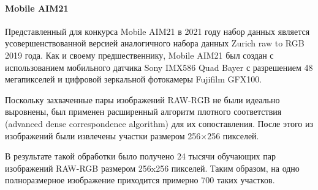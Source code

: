 \paragraph{Mobile AIM21}

Представленный для конкурса Mobile AIM21 в 2021 году набор данных является усовершенствованной версией аналогичного набора данных Zurich raw to RGB 2019 года. Как и своему предшественнику, Mobile AIM21 был создан с использованием мобильного датчика Sony IMX586 Quad Bayer с разрешением 48 мегапикселей и цифровой зеркальной фотокамеры Fujifilm GFX100.

Поскольку захваченные пары изображений RAW-RGB не были идеально выровнены, был применен расширенный алгоритм плотного соответствия (advanced dense correspondence algorithm) \cite{lib-aim-dense} для их сопоставления. После этого из изображений были извлечены участки размером 256×256 пикселей.

В результате такой обработки было получено 24 тысячи обучающих пар изображений RAW-RGB размером 256x256 пикселей. Таким образом, на одно полноразмерное изображение приходится примерно 700 таких участков.